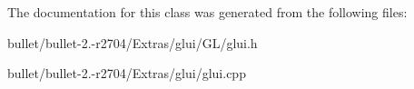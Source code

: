 The documentation for this class was generated from the following files\+:\begin{DoxyCompactItemize}
\item 
bullet/bullet-\/2.-\/r2704/\+Extras/glui/\+G\+L/glui.\+h\item 
bullet/bullet-\/2.-\/r2704/\+Extras/glui/glui.\+cpp\end{DoxyCompactItemize}
